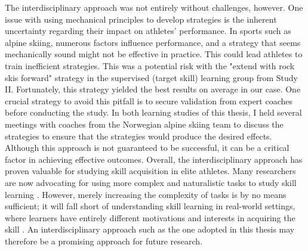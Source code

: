 The interdisciplinary approach was not entirely without challenges, however. One issue with using mechanical principles to develop strategies is the inherent uncertainty regarding their impact on athletes' performance. In sports such as alpine skiing, numerous factors influence performance, and a strategy that seems mechanically sound might not be effective in practice. This could lead athletes to train inefficient strategies. This was a potential risk with the "extend with rock skis forward" strategy in the supervised (target skill) learning group from Study II. Fortunately, this strategy yielded the best results on average in our case. One crucial strategy to avoid this pitfall is to secure validation from expert coaches before conducting the study. In both learning studies of this thesis, I held several meetings with coaches from the Norwegian alpine skiing team to discuss the strategies to ensure that the strategies would produce the desired effects. Although this approach is not guaranteed to be successful, it can be a critical factor in achieving effective outcomes. Overall, the interdisciplinary approach has proven valuable for studying skill acquisition in elite athletes. Many researchers are now advocating for using more complex and naturalistic tasks to study skill learning \parencite{haar_motor_2020, tsay_bridging_2024, du_relationship_2022, ingram_naturalistic_2011}. However, merely increasing the complexity of tasks is by no means sufficient; it will fall short of understanding skill learning in real-world settings, where learners have entirely different motivations and interests in acquiring the skill \parencite{williams_using_2017}. An interdisciplinary approach such as the one adopted in this thesis may therefore be a promising approach for future research. 



